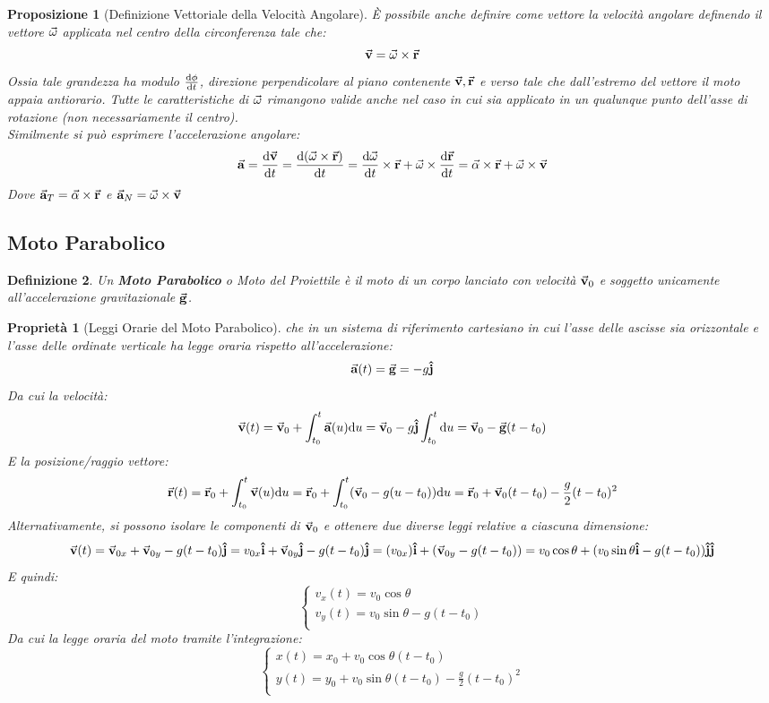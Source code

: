 \documentclass{article}
\newtheorem{property}{Proprietà}[section]
\newtheorem{defn}{Definizione}[section]
\newtheorem{prop}[defn]{Proposizione}
\renewcommand{\i}{\vu{i}}
\renewcommand{\j}{\vu{j}}
\renewcommand{\a}{\va{a}}
\renewcommand{\v}{\va{v}}
\renewcommand{\r}{\va{r}}
\newcommand{\g}{\va{g}}
\begin{document}
\begin{prop}[Definizione Vettoriale della Velocità Angolare]
È possibile anche definire come vettore la velocità angolare definendo il vettore $\va{\omega}$ applicata nel centro della circonferenza tale che:
\[\v=\va{\omega}\times\r\]
Ossia tale grandezza ha modulo $\dv{\phi}{t}$, direzione perpendicolare al piano contenente $\v,\r$ e verso tale che dall'estremo del vettore il moto appaia antiorario. Tutte le caratteristiche di $\va{\omega}$ rimangono valide anche nel caso in cui sia applicato in un qualunque punto dell'asse di rotazione (non necessariamente il centro).\\
Similmente si può esprimere l'accelerazione angolare:
\[\a=\dv{\v}{t}=\dv{(\va{\omega}\times\r)}{t}=\dv{\va{\omega}}{t}\times\r+\va{\omega}\times\dv{\r}{t}=\va{\alpha}\times\r+\va{\omega}\times\v\]
Dove $\a_T=\va{\alpha}\times\r$ e $\a_N=\va{\omega}\times\v$
\end{prop}

\subsection{Moto Parabolico}

\begin{defn}
Un \textbf{Moto Parabolico} o Moto del Proiettile è il moto di un corpo lanciato con velocità $\v_0$ e soggetto unicamente all'accelerazione gravitazionale $\g$.
\end{defn}

\begin{property}[Leggi Orarie del Moto Parabolico]
che in un sistema di riferimento cartesiano in cui l'asse delle ascisse sia orizzontale e l'asse delle ordinate verticale ha legge oraria rispetto all'accelerazione: 
\[\a(t)=\g=-g\j\]
Da cui la velocità:
\[\v(t)=\v_0+\int_{t_0}^t\a(u)\dd u=\v_0-g\j\int_{t_0}^t \dd u=\v_0-\g(t-t_0)\]
E la posizione/raggio vettore:
\[\r(t)=\r_0+\int_{t_0}^t\v(u)\dd u=\r_0+\int_{t_0}^t(\v_0-g(u-t_0))\dd u=\r_0+\v_0(t-t_0)-\frac{g}{2}(t-t_0)^2\]
Alternativamente, si possono isolare le componenti di $\v_0$ e ottenere due diverse leggi relative a ciascuna dimensione:
\[\v(t)=\v_{0x}+\v_{0y}-g(t-t_0)\j=v_{0x}\i+\v_{0y}\j-g(t-t_0)\j=(v_{0x})\i+(\v_{0y}-g(t-t_0))=v_0\cos\theta+(v_0\sin\theta\i-g(t-t_0))\j\j\]
E quindi:
\[\left\{\begin{array}{l}
    v_x(t)=v_0\cos\theta  \\
    v_y(t)=v_0\sin\theta-g(t-t_0)  \\
\end{array}\right.\]
Da cui la legge oraria del moto tramite l'integrazione:
\[\left\{\begin{array}{l}
    x(t)=x_0+v_0\cos\theta(t-t_0) \\
    y(t)=y_0+v_0\sin\theta(t-t_0)-\frac{g}{2}(t-t_0)^2 \\ 
\end{array}\right.\]
\end{property}
\end{document}
